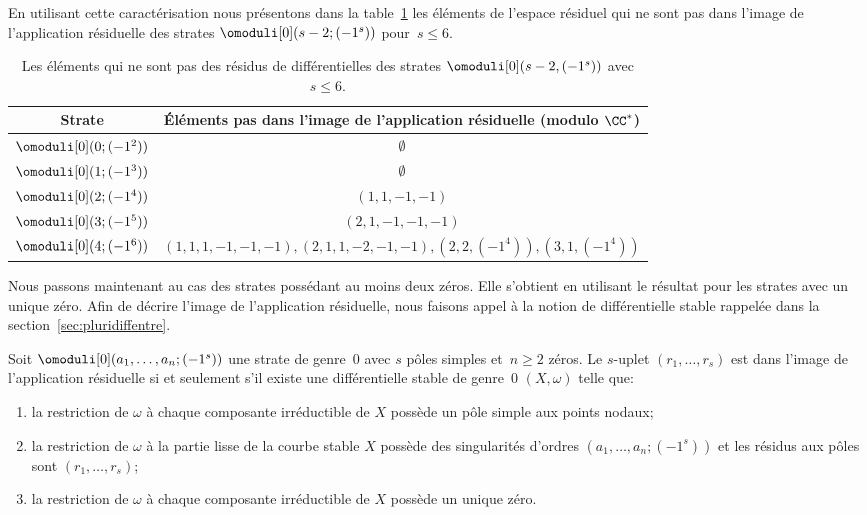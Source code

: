 En utilisant cette caractérisation nous présentons dans la table~\ref{tab:noim} les éléments de l'espace résiduel qui ne sont pas dans l'image de l'application résiduelle des strates $\omoduli[0](s-2;(-1^{s}))$ pour~$s\leq6$.
\par
\begin{table}[ht]
\smaller\renewcommand{\arraystretch}{1.3}
\begin{tabular}{|c|c|}
\hline
Strate & Éléments pas dans l'image de l'application résiduelle (modulo $\CC^{\ast}$)
\\
\hline
$\omoduli[0](0;(-1^{2}))$ & $\emptyset$ \\
\hline
$\omoduli[0](1;(-1^{3}))$ & $\emptyset$ \\
\hline
$\omoduli[0](2;(-1^{4}))$ & $(1,1,-1,-1)$ \\
\hline
$\omoduli[0](3;(-1^{5}))$ & $(2,1,-1,-1,-1)$ \\
\hline
$\omoduli[0](4;(-1^{6}))$& $(1,1,1,-1,-1,-1), (2,1,1,-2,-1,-1), (2,2,(-1^{4})), (3,1,(-1^{4}))$ \\
\hline
\end{tabular}
\vspace*{\baselineskip}
\caption{\label{tab:noim}Les éléments qui ne sont pas des résidus de différentielles des strates $\omoduli[0](s-2,(-1^{s}))$ avec $s\leq6$.}
\end{table}

Nous passons maintenant au cas des strates possédant au moins deux zéros. Elle s'obtient en utilisant le résultat pour les strates avec un unique zéro. Afin de décrire l'image de l'application résiduelle, nous faisons appel à la notion de différentielle stable rappelée dans la section~\ref{sec:pluridiffentre}.

\begin{lem}\label{lm:g0p-1plusieurszero}
Soit $\omoduli[0](a_{1},\dots,a_{n};(-1^{s}))$ une strate de genre~$0$ avec $s$ pôles simples et~$n\geq2$ zéros. Le $s$-uplet $(r_{1},\ldots,r_{s})$ est dans l'image de l'application résiduelle si et seulement s'il existe une différentielle stable de genre~$0$ $(X,\omega)$ telle que:
\begin{enumerate}
\item la restriction de $\omega$ à chaque composante irréductible de $X$ possède un pôle simple aux points nodaux;
\item la restriction de $\omega$ à la partie lisse de la courbe stable $X$ possède des singularités d'ordres $(a_{1},\dots,a_{n};(-1^{s}))$ et les résidus aux pôles sont $(r_{1},\dots,r_{s})$;
\item la restriction de $\omega$ à chaque composante irréductible de $X$ possède un unique zéro.
\end{enumerate}
\end{lem}

